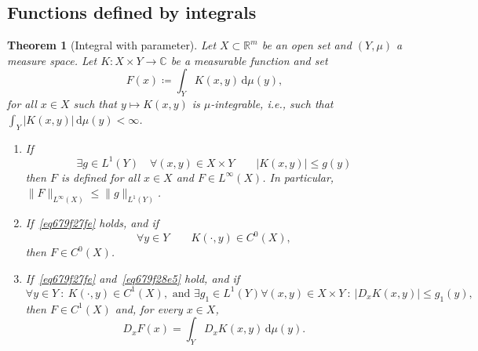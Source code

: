 \documentclass[a4paper,9pt]{amsart}
\newcommand{\R}{\mathbb{R}}	%
\newcommand{\C}{\mathbb{C}}	%
\newcommand{\did}{\,\mathrm{d}}	%
\newcommand{\abs}[1]{\left\lvert #1 \right\rvert}
\theoremstyle{plain}
\newtheorem{theorem}[proposition]{Theorem}
\theoremstyle{definition}
\theoremstyle{remark}
\begin{document}
\subsection{Functions defined by integrals}


\begin{theorem}[Integral with parameter]\label{thm679f29de}
	Let $X\subset\R^m$ be an open set and $(Y,\mu)$ a measure space.
	Let $K:X\times Y\to\C$ be a measurable function and set 
	\begin{equation}
		F(x) \coloneqq \int_Y K(x,y) \did\mu(y) ,
	\end{equation}
	for all $x\in X$ such that $y\mapsto K(x,y)$ is $\mu$-integrable,
	i.e., such that $\int_Y \abs{K(x,y)} \did\mu(y)<\infty$.

	\begin{enumerate}[label={\bf (\ref{thm679f29de}.\arabic*)}]
	\item\label{thm679f29de_1}
	If  
	\begin{equation}\label{eq679f27fe}
		\exists g\in L^1(Y)\quad \forall (x,y)\in X\times Y
		\qquad \abs{K(x,y)} \le g(y) 
	\end{equation}
	then $F$ is defined for all $x\in X$ and $F\in L^\infty(X)$.
	In particular, $\|F\|_{L^\infty(X)} \le \|g\|_{L^1(Y)}$.
	
	\item\label{thm679f29de_2}
	If~\eqref{eq679f27fe} holds, and if
	\begin{equation}\label{eq679f28e5}
		\forall y\in Y
		\qquad
		K(\cdot,y)\in C^0(X),
	\end{equation}
	then $F\in C^0(X)$.
	
	\item\label{thm679f29de_3}
	If~\eqref{eq679f27fe} and~\eqref{eq679f28e5} hold, and if 
	\begin{equation}\label{eq679f2b96}
		\forall y\in Y
		\ :\   K(\cdot,y)\in C^1(X),
		\text{ and }\exists g_1\in L^1(Y)\forall (x,y)\in X\times Y 
		\ :\ |D_xK(x,y)| \le g_1(y) ,
	\end{equation}
	then $F\in C^1(X)$ and, for every $x\in X$,
	\begin{equation}\label{eq679f2bf4}
		D_x F(x) = \int_Y D_xK(x,y) \did\mu(y) .
	\end{equation}
	\end{enumerate}
\end{theorem}
\end{document}
